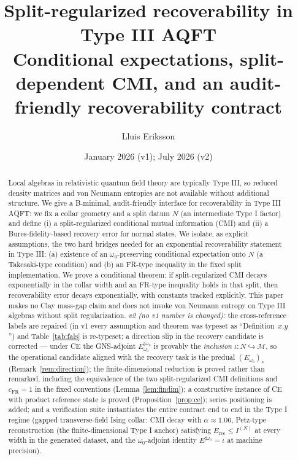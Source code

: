 \documentclass[11pt]{article}
\title{Split-regularized recoverability in Type III AQFT\\
\large Conditional expectations, split-dependent CMI, and an
audit-friendly recoverability contract}
\author{Lluis Eriksson}
\date{January 2026 (v1); July 2026 (v2)}
\theoremstyle{definition}
\theoremstyle{remark}
\newcommand{\Erec}{E_{\mathrm{rec}}}
\newcommand{\cM}{\mathcal{M}}
\begin{document}
\maketitle

\begin{abstract}
Local algebras in relativistic quantum field theory are typically Type
III, so reduced density matrices and von Neumann entropies are not
available without additional structure. We give a B-minimal,
audit-friendly interface for recoverability in Type III AQFT: we fix a
collar geometry and a split datum $N$ (an intermediate Type I factor)
and define (i) a split-regularized conditional mutual information (CMI)
and (ii) a Bures-fidelity-based recovery error for normal states. We
isolate, as explicit assumptions, the two hard bridges needed for an
exponential recoverability statement in Type III: (a) existence of an
$\omega_0$-preserving conditional expectation onto $N$ (a Takesaki-type
condition) and (b) an FR-type inequality in the fixed split
implementation. We prove a conditional theorem: if split-regularized CMI
decays exponentially in the collar width and an FR-type inequality holds
in that split, then recoverability error decays exponentially, with
constants tracked explicitly. This paper makes no Clay mass-gap claim
and does not invoke von Neumann entropy on Type III algebras without
split regularization. \emph{v2 (no v1 number is changed):} the
cross-reference labels are repaired (in v1 every assumption and theorem
was typeset as ``Definition~$x.y$'') and Table~\ref{tab:fals} is
re-typeset; a direction slip in the recovery candidate is corrected ---
under CE the GNS-adjoint $E_{\omega_0}^{\sharp\omega_0}$ is provably the
\emph{inclusion} $\iota: N \hookrightarrow \cM$, so the operational
candidate aligned with the recovery task is the predual
$(E_{\omega_0})_*$ (Remark~\ref{rem:direction}); the finite-dimensional
reduction is proved rather than remarked, including the equivalence of
the two split-regularized CMI definitions and $c_{\mathrm{FR}} = 1$ in
the fixed conventions (Lemma~\ref{lem:findim}); a constructive instance
of CE with product reference state is proved
(Proposition~\ref{prop:ce}); series positioning is added; and a
verification suite instantiates the entire contract end to end in the
Type I regime (gapped transverse-field Ising collar: CMI decay with
$\alpha \approx 1.06$, Petz-type reconstruction (the finite-dimensional Type I anchor) satisfying
$\Erec \le I^{(N)}$ at every width in the generated dataset, and the
$\omega_0$-adjoint identity $E^{\sharp\omega_0} = \iota$ at machine
precision).
\end{abstract}
\end{document}
